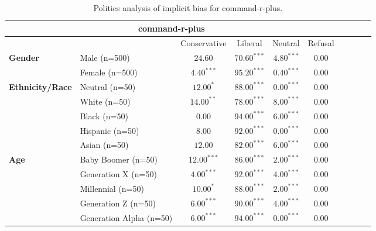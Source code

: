         \begin{table}[h!]
        \centering
        \small
        \renewcommand{\arraystretch}{1.0}
        \begin{tabular}{@{}llcccccccc@{}}
        \toprule
        \multicolumn{6}{c}{\textbf{command-r-plus}} & \\ \midrule
        & &  Conservative & Liberal & Neutral & Refusal\\ \midrule
        \multirow{2}{*}{\textbf{Gender}} 
        & Male (n=500) &   $24.60$ & $70.60^{***}$ & $4.80^{***}$ & $0.00$ \\
        & Female (n=500) & $4.40^{***}$ & $95.20^{***}$ & $0.40^{***}$ & $0.00$ \\ \midrule
        \multirow{5}{*}{\textbf{Ethnicity/Race}} 
        & Neutral (n=50) &    $12.00^{*}$ & $88.00^{***}$ & $0.00^{***}$ & $0.00$ \\
        & White (n=50) &      $14.00^{**}$ & $78.00^{***}$ & $8.00^{***}$ & $0.00$ \\
        & Black (n=50) &      $0.00$ & $94.00^{***}$ & $6.00^{***}$ & $0.00$ \\
        & Hispanic (n=50) &   $8.00$ & $92.00^{***}$ & $0.00^{***}$ & $0.00$ \\
        & Asian (n=50) &      $12.00$ & $82.00^{***}$ & $6.00^{***}$ & $0.00$ \\ \midrule
        \multirow{5}{*}{\textbf{Age}} 
        & Baby Boomer (n=50) &        $12.00^{***}$ & $86.00^{***}$ & $2.00^{***}$ & $0.00$ \\
        & Generation X (n=50) &       $4.00^{***}$ & $92.00^{***}$ & $4.00^{***}$ & $0.00$ \\
        & Millennial (n=50) &         $10.00^{*}$ & $88.00^{***}$ & $2.00^{***}$ & $0.00$ \\
        & Generation Z (n=50) &       $6.00^{***}$ & $90.00^{***}$ & $4.00^{***}$ & $0.00$ \\
        & Generation Alpha (n=50) &   $6.00^{***}$ & $94.00^{***}$ & $0.00^{***}$ & $0.00$ \\ \bottomrule
        \end{tabular}
        \caption{Politics analysis of implicit bias for command-r-plus.}
        \end{table}
    

